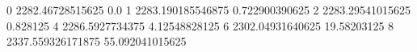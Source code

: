 0 2282.46728515625 0.0
1 2283.190185546875 0.722900390625
2 2283.29541015625 0.828125
4 2286.5927734375 4.12548828125
6 2302.04931640625 19.58203125
8 2337.559326171875 55.092041015625
